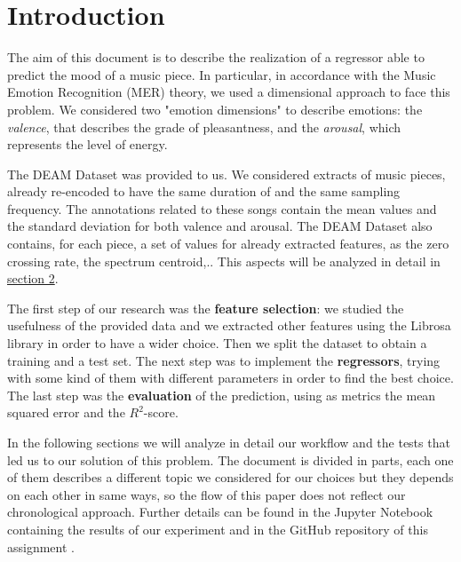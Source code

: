 \section{Introduction}

The aim of this document is to describe the realization of a regressor able to predict the mood of a music piece. In particular, in accordance with the Music Emotion Recognition (MER) theory, we used a dimensional approach to face this problem. We considered two "emotion dimensions" to describe emotions: the \emph{valence}, that describes the grade of pleasantness, and the \emph{arousal}, which represents the level of energy.

The DEAM Dataset was provided to us. We considered extracts of music pieces, already re-encoded to have the same duration of and the same sampling frequency. The annotations related to these songs contain the mean values and the standard deviation for both valence and arousal. The DEAM Dataset also contains, for each piece, a set of values for already extracted features, as the zero crossing rate, the spectrum centroid,.. This aspects will be analyzed in detail in \hyperref[sec:music database]{section 2}.

The first step of our research was the \textbf{feature selection}: we studied the usefulness of the provided data and we extracted other features using the Librosa library in order to have a wider choice. Then we split the dataset to obtain a training and a test set. The next step was to implement the \textbf{regressors}, trying with some kind of them with different parameters in order to find the best choice. The last step was the \textbf{evaluation} of the prediction, using as metrics the mean squared error and the $R^2$-score.

In the following sections we will analyze in detail our workflow and the tests that led us to our solution of this problem. The document is divided in parts, each one of them describes a different topic we considered for our choices but they depends on each other in same ways, so the flow of this paper does not reflect our chronological approach. Further details can be found in the Jupyter Notebook containing the results of our experiment \cite{notebook} and in the GitHub repository of this assignment \cite{github}.

